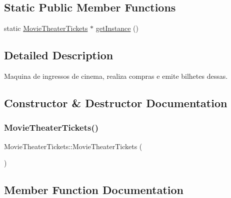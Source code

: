 \subsection*{Static Public Member Functions}
\begin{DoxyCompactItemize}
\item 
static \hyperlink{class_movie_theater_tickets}{Movie\+Theater\+Tickets} $\ast$ \hyperlink{class_movie_theater_tickets_af7634290813078d05ef46a4321ced062}{get\+Instance} ()
\end{DoxyCompactItemize}


\subsection{Detailed Description}
Maquina de ingressos de cinema, realiza compras e emite bilhetes dessas. 

\subsection{Constructor \& Destructor Documentation}
\mbox{\label{class_movie_theater_tickets_aef090188bf8b001538ee280c1ed889e5}} 
\subsubsection{\texorpdfstring{Movie\+Theater\+Tickets()}{MovieTheaterTickets()}}
{\footnotesize\ttfamily Movie\+Theater\+Tickets\+::\+Movie\+Theater\+Tickets (\begin{DoxyParamCaption}{ }\end{DoxyParamCaption})}



\subsection{Member Function Documentation}
\mbox{\label{class_movie_theater_tickets_a17e3580fee82f4477c4cc3f27283af5a}} 
